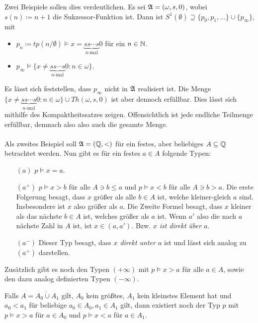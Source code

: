 Zwei Beispiele sollen dies verdeutlichen. Es sei $\mathfrak{A}=(\omega,s,0)$, wobei $s(n)\coloneqq n+1$ die Sukzessor-Funktion ist. Dann ist $S^1(\emptyset)\supseteq\{p_0,p_1,\dots\}\cup\{p_\infty\}$, mit
\begin{itemize}
	\item $p_n\coloneqq tp(n/\emptyset)\models x=\underbrace{ss\cdots s}_{n\text{-mal}}0$ für ein $n\in \mathbb{N}$.
	\item $p_\infty\models\{x\neq\underbrace{ss\cdots s}_{n\text{-mal}}0 : n\in\omega\}$.
\end{itemize}
Es lässt sich feststellen, dass $p_\infty$ nicht in $\mathfrak{A}$ realisiert ist. Die Menge $\{x\neq\underbrace{ss\cdots s}_{n\text{-mal}}0 : n\in\omega\}\cup Th(\omega,s,0)$ ist aber dennoch erfüllbar. Dies lässt sich mithilfe des Kompaktheitssatzes zeigen. Offensichtlich ist jede endliche Teilmenge erfüllbar, demnach also also auch die gesamte Menge.
\\
\\
Als zweites Beispiel soll $\mathfrak{A}=(\mathbb{Q},<)$ für ein festes, aber beliebiges $A\subseteq \mathbb{Q}$ betrachtet werden. Nun gibt es für ein festes $a\in A$ folgende Typen:
\begin{itemize}
	\item[$(a)$] $p\models x=a$.
	\item[$(a^+)$] $p\models x>b$ für alle $A\ni b\leq a$ und $p\models x<b$ für alle $A\ni b>a$. Die erste Folgerung besagt, dass $x$ größer als alle $b\in A$ ist, welche kleiner-gleich $a$ sind. Insbesondere ist $x$ also größer als $a$. Die Zweite Formel besagt, dass $x$ kleiner als das nächste $b\in A$ ist, welches größer als $a$ ist. Wenn $a'$ also die nach $a$ nächste Zahl in $A$ ist, ist $x\in(a,a')$. Bzw. \textit{$x$ ist direkt über $a$}.
	\item[$(a^-)$] Dieser Typ besagt, dass \textit{$x$ direkt unter $a$} ist und lässt sich analog zu $(a^+)$ darstellen.
\end{itemize}
Zusätzlich gibt es noch den Typen $(+\infty)$ mit $p\models x>a$ für alle $a\in A$, sowie den dazu analog definierten Typen $(-\infty)$.

Falls $A=A_0\dot{\cup}A_1$ gilt, $A_0$ kein größtes, $A_1$ kein kleinstes Element hat und $a_0<a_1$ für beliebige $a_0\in A_0,a_1\in A_1$ gilt, dann existiert noch der Typ $p$ mit $p\models x>a$ für $a\in A_0$ und $p\models x<a$ für $a\in A_1$.


